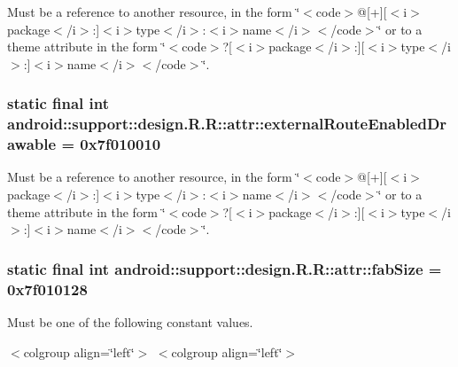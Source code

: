 Must be a reference to another resource, in the form \char`\"{}$<$code$>$@\mbox{[}+\mbox{]}\mbox{[}$<$i$>$package$<$/i$>$:\mbox{]}$<$i$>$type$<$/i$>$:$<$i$>$name$<$/i$>$$<$/code$>$\char`\"{} or to a theme attribute in the form \char`\"{}$<$code$>$?\mbox{[}$<$i$>$package$<$/i$>$:\mbox{]}\mbox{[}$<$i$>$type$<$/i$>$:\mbox{]}$<$i$>$name$<$/i$>$$<$/code$>$\char`\"{}. \hypertarget{classandroid_1_1support_1_1design_1_1_r_1_1attr_6e5eb6db27967c8beb35382dbd4edb62}{
\subsubsection[{externalRouteEnabledDrawable}]{\setlength{\rightskip}{0pt plus 5cm}static final int android::support::design.R.R::attr::externalRouteEnabledDrawable = 0x7f010010}}
\label{classandroid_1_1support_1_1design_1_1_r_1_1attr_6e5eb6db27967c8beb35382dbd4edb62}


Must be a reference to another resource, in the form \char`\"{}$<$code$>$@\mbox{[}+\mbox{]}\mbox{[}$<$i$>$package$<$/i$>$:\mbox{]}$<$i$>$type$<$/i$>$:$<$i$>$name$<$/i$>$$<$/code$>$\char`\"{} or to a theme attribute in the form \char`\"{}$<$code$>$?\mbox{[}$<$i$>$package$<$/i$>$:\mbox{]}\mbox{[}$<$i$>$type$<$/i$>$:\mbox{]}$<$i$>$name$<$/i$>$$<$/code$>$\char`\"{}. \hypertarget{classandroid_1_1support_1_1design_1_1_r_1_1attr_164c88fcdd08b968682272a6da0cee21}{
\subsubsection[{fabSize}]{\setlength{\rightskip}{0pt plus 5cm}static final int android::support::design.R.R::attr::fabSize = 0x7f010128}}
\label{classandroid_1_1support_1_1design_1_1_r_1_1attr_164c88fcdd08b968682272a6da0cee21}


Must be one of the following constant values. \begin{TabularC}{0}
\hline
\end{TabularC}
$<$colgroup align=\char`\"{}left\char`\"{}$>$ $<$colgroup align=\char`\"{}left\char`\"{}$>$ 

